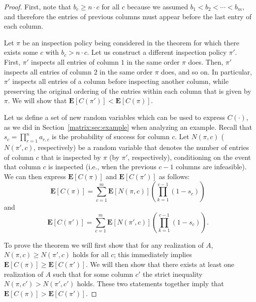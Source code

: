  \begin{proof}
 First, note that $b_c \geq n\cdot c$ for all $c$ because we assumed $b_1 < b_2 < \cdots < b_m$, and therefore the entries of previous columns must appear before the last entry of each column.

 Let $\pi$ be an inspection policy being considered in the theorem for which there exists some $c$ with $b_{c} > n \cdot c$.
 Let us construct a different inspection policy $\pi'$.
 First, $\pi'$ inspects all entries of column $1$ in the same order $\pi$ does. 
 Then, $\pi'$ inspects all entries of column $2$ in the same order $\pi$ does, and so on. 
 In particular, $\pi'$ inspects all entries of a column before inspecting another column, while preserving the original ordering of the entries within each column that is given by $\pi$. 
 We will show that $\mathbf{E}[C(\pi')] < \mathbf{E}[C(\pi)]$.

 Let us define a set of new random variables which can be used to express $C(\cdot)$, as we did in Section~\ref{matrix:sec:example} when analyzing an example.
 Recall that $s_c = \prod_{r=1}^{n} a_{r,c}$ is the probability of success for column $c$.
 Let $N(\pi, c)$ ($N(\pi', c)$, respectively) be a random variable that denotes the number of entries of column $c$ that is inspected by $\pi$ (by $\pi'$, respectively), conditioning on the event that column $c$ is inspected (i.e., when the previous $c-1$ columns are infeasible).
 We can then express $\mathbf{E}[C(\pi)]$ and $\mathbf{E}[C(\pi')]$ as follows:
 \begin{equation} \label{matrix:eqn:exp_c_pi_decoupled}
 	\mathbf{E}[C(\pi)] = \sum_{c=1}^{m} \mathbf{E}[N(\pi, c)]\left( \prod_{k=1}^{c-1} (1 - s_c) \right)
 \end{equation}
 and
 \begin{equation} \label{matrix:eqn:exp_c_pi2_decoupled}
 	\mathbf{E}[C(\pi')] = \sum_{c=1}^{m} \mathbf{E}[N(\pi', c)]\left( \prod_{k=1}^{c-1} (1 - s_c) \right).
 \end{equation}


 To prove the theorem we will first show that for any realization of $A$, $N(\pi, c) \geq N(\pi', c)$ holds for all $c$; this immediately implies $\mathbf{E}[C(\pi)] \geq \mathbf{E}[C(\pi')]$.
 We will then show that there exists at least one realization of $A$ such that for some column $c'$ the strict inequality $N(\pi, c') > N(\pi', c')$ holds. These two statements together imply that $\mathbf{E}[C(\pi)] > \mathbf{E}[C(\pi')]$.



\end{proof}
